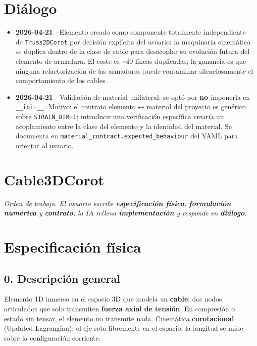 \documentclass[11pt,letterpaper,oneside]{report}
\begin{document}
\section{Diálogo}

\begin{itemize}
  \item \textbf{2026-04-21} \ensuremath{\cdot} Elemento creado como componente totalmente independiente de \texttt{Truss2DCorot} por decisión explícita del usuario: la maquinaria cinemática se duplica dentro de la clase de cable para desacoplar su evolución futura del elemento de armadura. El coste es \textasciitilde{}40 líneas duplicadas; la ganancia es que ninguna refactorización de las armaduras puede contaminar silenciosamente el comportamiento de los cables.
  \item \textbf{2026-04-21} \ensuremath{\cdot} Validación de material unilateral: se optó por \textbf{no} imponerla en \texttt{\_\_init\_\_}. Motivo: el contrato elemento\ensuremath{\leftrightarrow}material del proyecto es genérico sobre \texttt{STRAIN\_DIM=1}; introducir una verificación específica crearía un acoplamiento entre la clase del elemento y la identidad del material. Se documenta en \texttt{material\_contract.expected\_behaviour} del YAML para orientar al usuario.
\end{itemize}


\newpage

\section{Cable3DCorot}



\textit{Orden de trabajo. El usuario escribe \textbf{especificación física}, \textbf{formulación numérica} y \textbf{contrato}; la IA rellena \textbf{implementación} y responde en \textbf{diálogo}.}



\section{Especificación física}

\subsection{0. Descripción general}
Elemento 1D inmerso en el espacio 3D que modela un \textbf{cable}: dos nodos articulados que solo transmiten \textbf{fuerza axial de tensión}. En compresión o estado sin tensar, el elemento no transmite nada. Cinemática \textbf{corotacional} (Updated Lagrangian): el eje rota libremente en el espacio, la longitud se mide sobre la configuración corriente.
\end{document}
